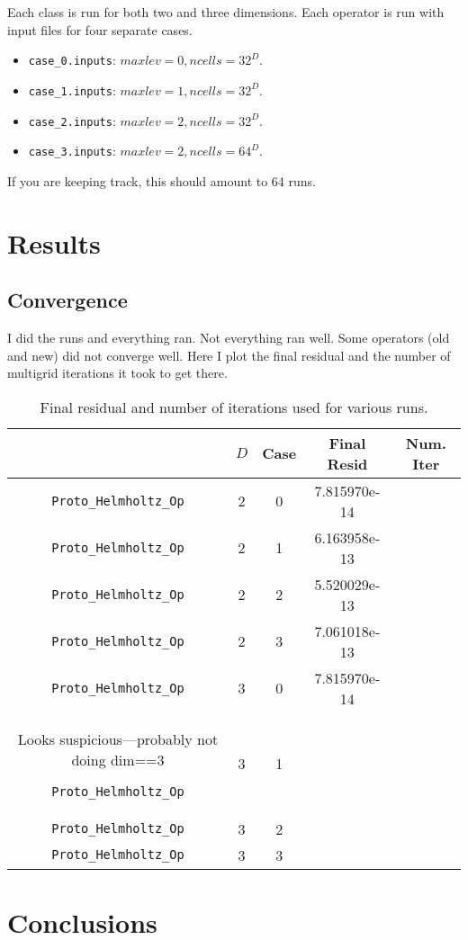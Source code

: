 \documentclass{article}
\begin{document}
 Each class is run for both two and three dimensions.   Each operator
 is run with input files for four separate cases.    
 \begin{itemize}
   \item {\tt case\_0.inputs}: $maxlev = 0, ncells = 32^D$.
   \item {\tt case\_1.inputs}: $maxlev = 1, ncells = 32^D$.
   \item {\tt case\_2.inputs}: $maxlev = 2, ncells = 32^D$.
   \item {\tt case\_3.inputs}: $maxlev = 2, ncells = 64^D$.
 \end{itemize}
 If you are keeping track, this should amount to 64 runs.

\section{Results}

\subsection{Convergence}
I did the runs and everything ran.   Not everything ran well.   Some
operators (old and new) did not converge well.   Here I plot the final
residual and the number of multigrid iterations it took to get there.

\begin{small}
\begin{table}
\begin{center}
\begin{tabular}{|c|c|c|c|c}} \hline
Operator & $D$ & Case & Final Resid & Num. Iter \\
\hline
{\tt Proto\_Helmholtz\_Op} & 2  & 0   & 7.815970e-14  & \\
{\tt Proto\_Helmholtz\_Op} & 2  & 1   & 6.163958e-13  & \\
{\tt Proto\_Helmholtz\_Op} & 2  & 2   & 5.520029e-13  & \\
{\tt Proto\_Helmholtz\_Op} & 2  & 3   & 7.061018e-13  & \\
{\tt Proto\_Helmholtz\_Op} & 3  & 0   & 7.815970e-14  & \\
Looks suspicious---probably not doing dim==3

{\tt Proto\_Helmholtz\_Op} & 3  & 1   &   & \\
{\tt Proto\_Helmholtz\_Op} & 3  & 2   &   & \\
{\tt Proto\_Helmholtz\_Op} & 3  & 3   &   & \\
\hline
\end{tabular}
\end{center}
\label{tab::convergence}
\caption
 {
   Final residual and number of iterations used for various runs.
 }
\end{table}
\end{small}

\section{Conclusions}
\end{document}
